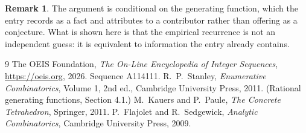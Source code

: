 \documentclass[11pt,a4paper]{article}
\theoremstyle{plain}
\theoremstyle{definition}
\newtheorem{remark}[theorem]{Remark}
\begin{document}
\begin{remark}
The argument is conditional on the generating function, which the entry records as a fact and
attributes to a contributor rather than offering as a conjecture. What is shown here is that
the empirical recurrence is not an independent guess: it is equivalent to information the
entry already contains.
\end{remark}

\begin{thebibliography}{9}
 The OEIS Foundation, \emph{The On-Line Encyclopedia of Integer
Sequences}, \url{https://oeis.org}, 2026. Sequence A114111.
 R.~P.~Stanley, \emph{Enumerative Combinatorics}, Volume 1, 2nd ed.,
Cambridge University Press, 2011. (Rational generating functions, Section 4.1.)
 M.~Kauers and P.~Paule, \emph{The Concrete Tetrahedron}, Springer, 2011.
 P.~Flajolet and R.~Sedgewick, \emph{Analytic Combinatorics}, Cambridge
University Press, 2009.
\end{thebibliography}
\end{document}
